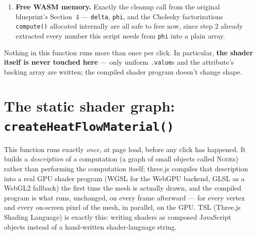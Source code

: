\documentclass[11pt]{article}
\newcommand{\code}[1]{\texttt{#1}}
\newcommand{\func}[1]{\texttt{\textbf{#1}}}
\newcommand{\type}[1]{\textsc{#1}}
\begin{document}
\begin{enumerate}[leftmargin=1.6em]
  \code{animationStartTime}. Practically: re-clicking mid-wave updates \emph{where} the
  band is centered relative to (the new \code{geodesicDist} field and
  \code{waveMaxDistance}) but does \emph{not} restart the sweep visually from the
  beginning --- the band can appear to jump straight to wherever the old timer's progress
  fraction already was. This is a real difference from the old V1 version, which
  unconditionally reset its timer on \emph{every} click. See
  Section~\ref{sec:timeline}'s last row for this played out concretely.
\item \textbf{Free WASM memory.} Exactly the cleanup call from the original blueprint's
  Section~4 --- \code{delta}, \code{phi}, and the Cholesky factorizations \code{compute()}
  allocated internally are all safe to free now, since step 2 already extracted every
  number this script needs from \code{phi} into a plain array.
\end{enumerate}

Nothing in this function runs more than once per click. In particular, \textbf{the shader
itself is never touched here} --- only uniform \code{.value}s and the attribute's backing
array are written; the compiled shader program doesn't change shape.

\section{The static shader graph: \func{createHeatFlowMaterial()}}
\label{sec:shader}

This function runs exactly \emph{once}, at page load, before any click has happened. It
builds a \emph{description} of a computation (a graph of small objects called
\type{Node}s) rather than performing the computation itself; three.js compiles that
description into a real GPU shader program (WGSL for the WebGPU backend, GLSL as a WebGL2
fallback) the first time the mesh is actually drawn, and the compiled program is what
runs, unchanged, on every frame afterward --- for every vertex and every on-screen pixel of
the mesh, in parallel, on the GPU. TSL (Three.js Shading Language) is exactly this: writing
shaders as composed JavaScript objects instead of a hand-written shader-language string.
\end{document}
